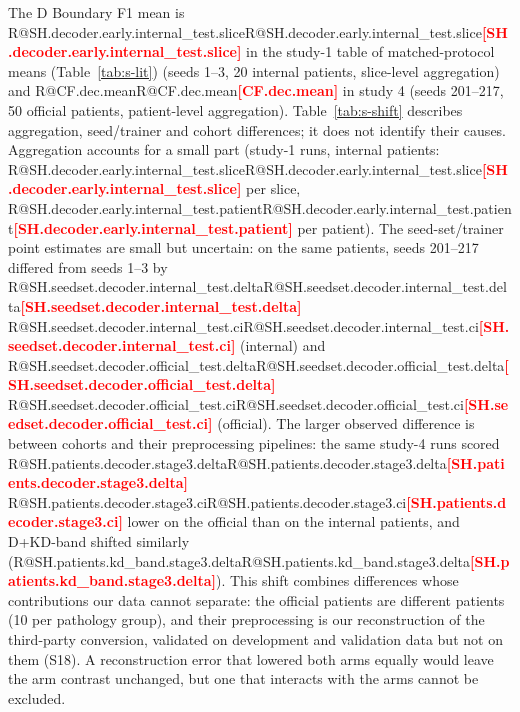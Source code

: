 \documentclass[10pt]{article}
\makeatletter
\newcommand{\R}[1]{\ifcsname R@#1\endcsname\csname R@#1\endcsname\else\textbf{\textcolor{red}{[#1]}}\fi}
\renewcommand\paragraph{\@startsection{paragraph}{4}{\z@}{1.6ex \@plus .5ex \@minus .2ex}{-1em}{\normalfont\normalsize\bfseries}}
\makeatother
\begin{document}
\begin{table}[!htbp]\centering\small

\caption{\label{tab:s-errloc}Share of D's wrong pixels within 2\,px of the reference contour, mean Boundary F1 gain over D, and Spearman $\rho$ between gain and near-boundary share across the 50 patients (post hoc).}
\end{table}

\paragraph{The D mean in studies 1 and 4.} The D Boundary F1 mean is \R{SH.decoder.early.internal_test.slice} in the study-1 table of matched-protocol means (Table~\ref{tab:s-lit}) (seeds 1--3, 20 internal patients, slice-level aggregation) and \R{CF.dec.mean} in study 4 (seeds 201--217, 50 official patients, patient-level aggregation). Table~\ref{tab:s-shift} describes aggregation, seed/trainer and cohort differences; it does not identify their causes. Aggregation accounts for a small part (study-1 runs, internal patients: \R{SH.decoder.early.internal_test.slice} per slice, \R{SH.decoder.early.internal_test.patient} per patient). The seed-set/trainer point estimates are small but uncertain: on the same patients, seeds 201--217 differed from seeds 1--3 by \R{SH.seedset.decoder.internal_test.delta} \R{SH.seedset.decoder.internal_test.ci} (internal) and \R{SH.seedset.decoder.official_test.delta} \R{SH.seedset.decoder.official_test.ci} (official). The larger observed difference is between cohorts and their preprocessing pipelines: the same study-4 runs scored \R{SH.patients.decoder.stage3.delta} \R{SH.patients.decoder.stage3.ci} lower on the official than on the internal patients, and D+KD-band shifted similarly (\R{SH.patients.kd_band.stage3.delta}). This shift combines differences whose contributions our data cannot separate: the official patients are different patients (10 per pathology group), and their preprocessing is our reconstruction of the third-party conversion, validated on development and validation data but not on them (S18). A reconstruction error that lowered both arms equally would leave the arm contrast unchanged, but one that interacts with the arms cannot be excluded.

\begin{table}[!htbp]\centering\small

\caption{\label{tab:s-shift}Boundary F1 of D and D+KD-band by seed set and test patients (post hoc). Slice-level: class macro per slice, averaged over slices (as in Table~\ref{tab:s-lit}); patient-level: averaged per patient first (the estimator of study 4). Means of run means (SD between runs).}
\end{table}
\end{document}
